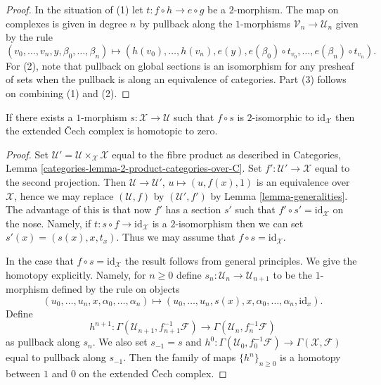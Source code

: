 \begin{proof}
In the situation of (1) let $t : f \circ h \to e \circ g$ be a $2$-morphism.
The map on complexes is given in degree $n$ by
pullback along the $1$-morphisms
$\mathcal{V}_n \to \mathcal{U}_n$ given by the rule
$$
(v_0, \ldots, v_n, y, \beta_0, \ldots, \beta_n)
\longmapsto
(h(v_0), \ldots, h(v_n), e(y),
e(\beta_0) \circ t_{v_0}, \ldots, e(\beta_n) \circ t_{v_n}).
$$
For (2), note that pullback on global sections is an isomorphism
for any presheaf of sets when the pullback is along an equivalence
of categories. Part (3) follows on combining (1) and (2).
\end{proof}

\begin{lemma}
\label{lemma-homotopy}
If there exists a $1$-morphism $s : \mathcal{X} \to \mathcal{U}$
such that $f \circ s$ is $2$-isomorphic to $\text{id}_\mathcal{X}$
then the extended {\v C}ech complex is homotopic to zero.
\end{lemma}

\begin{proof}
Set $\mathcal{U}' = \mathcal{U} \times_\mathcal{X} \mathcal{X}$
equal to the fibre product as described in
Categories, Lemma \ref{categories-lemma-2-product-categories-over-C}.
Set $f' : \mathcal{U}' \to \mathcal{X}$ equal to the second projection.
Then $\mathcal{U} \to \mathcal{U}'$, $u \mapsto (u, f(x), 1)$
is an equivalence over $\mathcal{X}$, hence we may replace
$(\mathcal{U}, f)$ by $(\mathcal{U}', f')$ by
Lemma \ref{lemma-generalities}.
The advantage of this is that now $f'$ has a section $s'$ such
that $f' \circ s' = \text{id}_\mathcal{X}$ on the nose. Namely, if
$t : s \circ f \to \text{id}_\mathcal{X}$ is a $2$-isomorphism
then we can set $s'(x) = (s(x), x, t_x)$. Thus we may assume that
$f \circ s = \text{id}_\mathcal{X}$.

\medskip\noindent
In the case that $f \circ s = \text{id}_\mathcal{X}$ the result follows
from general principles. We give the homotopy explicitly. Namely,
for $n \geq 0$ define $s_n : \mathcal{U}_n \to \mathcal{U}_{n + 1}$
to be the $1$-morphism defined by the rule on objects
$$
(u_0, \ldots, u_n, x, \alpha_0, \ldots, \alpha_n)
\longmapsto
(u_0, \ldots, u_n, s(x), x,
\alpha_0, \ldots, \alpha_n, \text{id}_x).
$$
Define
$$
h^{n + 1} :
\Gamma(\mathcal{U}_{n + 1}, f_{n + 1}^{-1}\mathcal{F})
\longrightarrow
\Gamma(\mathcal{U}_n, f_n^{-1}\mathcal{F})
$$
as pullback along $s_n$. We also set $s_{-1} = s$ and
$h^0 : \Gamma(\mathcal{U}_0, f_0^{-1}\mathcal{F}) \to
\Gamma(\mathcal{X}, \mathcal{F})$ equal to pullback along $s_{-1}$.
Then the family of maps $\{h^n\}_{n \geq 0}$ is a homotopy between
$1$ and $0$ on the extended {\v C}ech complex.
\end{proof}









